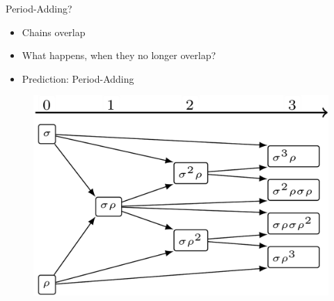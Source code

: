 \begin{frame}{Period-Adding?}
	\vspace{-1em}
	\begin{itemize}
		\item Chains overlap
		\item What happens, when they no longer overlap?
		      \vspace{1em}
		\item Prediction: Period-Adding
	\end{itemize}
	\begin{figure}
		\includegraphics[height=.5 \textheight]{Figs/Trees/ClassicalAdding/adding.png}
	\end{figure}
\end{frame}

